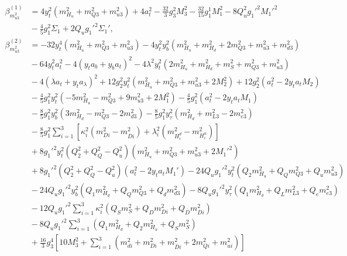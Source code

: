 \documentclass[preprint,amsmath,amssymb,aps,superscriptaddress,prd,showpacs,floatfix,nofootinbib]{revtex4-1}
\begin{document}
\begin{subequations}
\begin{align}
\beta_{m_{u3}^2}^{(1)}&=4y_t^2\left ( m_{H_u}^2+m_{Q3}^2+m_{u3}^2\right )+4a_t^2-\frac{32}{3}g_3^2M_3^2-\frac{32}{15}g_1^1M_1^2-8Q_u^2g_1'^2M_1'^2\nonumber\\
&{}-\frac{4}{5}g_1^2\Sigma_1+2Q_ug_1'^2\Sigma_1',\label{eq:USSMmu222BetaOneLoop}\\
\beta_{m_{u3}^2}^{(2)}&=-32y_t^4\left ( m_{H_u}^2+m_{Q3}^2+m_{u3}^2\right )-4y_t^2y_b^2\left ( m_{H_u}^2+m_{H_d}^2+2m_{Q3}^2+m_{u3}^2+m_{d3}^2\right )\nonumber\\
&{}-64y_t^2a_t^2-4\left ( y_ta_b+y_ba_t\right )^2-4\lambda^2y_t^2\left ( 2m_{H_u}^2+m_{H_d}^2+m_S^2+m_{Q3}^2+m_{u3}^2\right )\nonumber\\
&{}-4\left ( \lambda a_t + y_ta_\lambda \right )^2+12g_2^2y_t^2\left ( m_{H_u}^2+m_{Q3}^2+m_{u3}^2+2M_2^2\right )+12g_2^2\left ( a_t^2-2y_ta_tM_2\right )\nonumber\\
&{}-\frac{4}{5}g_1^2y_t^2\left ( -5m_{H_u}^2-m_{Q3}^2+9m_{u3}^2+2M_1^2\right )-\frac{4}{5}g_1^2\left ( a_t^2-2y_ta_tM_1 \right )\nonumber\\
&{}-\frac{8}{5}g_1^2y_b^2\left ( 3m_{H_d}^2-m_{Q3}^2-2m_{d3}^2\right )-\frac{8}{5}g_1^2y_\tau^2\left ( m_{H_d}^2+m_{L3}^2-2m_{e3}^2\right )\nonumber\\
&{}-\frac{8}{5}g_1^2\sum_{i=1}^3\left [ \kappa_i^2\left ( m_{Di}^2-m_{\overline{D}i}^2 \right )+\lambda_i^2\left ( m_{H_i^d}^2-m_{H_i^u}^2 \right )\right ]\nonumber\\
&{}+8g_1'^2y_t^2\left ( Q_2^2+Q_Q^2-Q_u^2\right )\left ( m_{H_u}^2+m_{Q3}^2+m_{u3}^2+2M_1'^2\right )\nonumber\\
&{}+8g_1'^2\left ( Q_2^2+Q_Q^2-Q_u^2\right )\left ( a_t^2-2y_ta_tM_1'\right )-24Q_ug_1'^2y_t^2\left (Q_2m_{H_u}^2+Q_Qm_{Q3}^2+Q_um_{u3}^2\right )\nonumber\\
&{}-24Q_ug_1'^2y_b^2\left ( Q_1m_{H_d}^2+Q_Qm_{Q3}^2+Q_dm_{d3}^2\right )-8Q_ug_1'^2y_\tau^2\left ( Q_1m_{H_d}^2+Q_Lm_{L3}^2+Q_em_{e3}^2\right )\nonumber\\
&{}-12Q_ug_1'^2\sum_{i=1}^3\kappa_i^2\left ( Q_Sm_S^2+Q_Dm_{Di}^2+Q_{\overline{D}}m_{\overline{D}i}^2\right )\nonumber\\
&{}-8Q_ug_1'^2\sum_{i=1}^3\left ( Q_1m_{H_d}^2+Q_2m_{H_u}^2+Q_Sm_S^2\right )\nonumber\\
&{}+\frac{16}{3}g_3^4\left [ 10M_3^2+\sum_{i=1}^3\left ( m_{di}^2+m_{Di}^2+m_{\overline{D}i}^2+2m_{Qi}^2+m_{ui}^2\right )\right ]\nonumber\\

\end{align}
\end{subequations}
\end{document}
